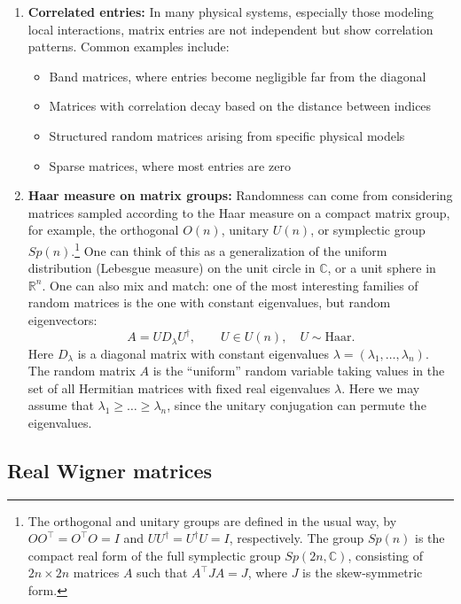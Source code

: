 \documentclass[letterpaper,11pt,oneside,reqno]{book}
\numberwithin{equation}{chapter}  %
\theoremstyle{definition}
\begin{document}
\begin{enumerate}
\item \textbf{Correlated entries:}
In many physical systems, especially those modeling local interactions, matrix entries are not independent but show correlation patterns. Common examples include:
\begin{itemize}
\item Band matrices, where entries become negligible far from the diagonal
\item Matrices with correlation decay based on the distance between indices
\item Structured random matrices arising from specific physical models
\item Sparse matrices, where most entries are zero
\end{itemize}
\item \textbf{Haar measure on matrix groups:}
Randomness can come from considering matrices sampled according to the Haar measure on a compact matrix group,
for example, the orthogonal $O(n)$, unitary $U(n)$, or symplectic group $Sp(n)$.\footnote{The
	orthogonal and unitary groups are defined
	in the usual way, by $OO^\top=O^\top O=I$ and $UU^\dagger
	=U^\dagger U=I$, respectively.
	The
	group $Sp(n)$ is the compact real form of the full symplectic group $Sp(2n, \mathbb{C})$,
	consisting of $2n\times 2n$ matrices $A$ such that $A^\top JA=J$, where
	$J$ is the skew-symmetric form.}
One can think of this as a generalization of
the uniform distribution (Lebesgue measure) on the unit circle in $\mathbb{C}$,
or a unit sphere in $\mathbb{R}^n$.
One can also mix and match: one
of the most interesting families of random matrices is the one
with constant eigenvalues, but random eigenvectors:
\begin{equation*}
	A=UD_\lambda U^\dagger,\qquad U\in U(n), \quad U\sim \mathrm{Haar}.
\end{equation*}
Here $D_\lambda$ is a diagonal matrix with constant eigenvalues $\lambda=(\lambda_1,\ldots,\lambda_n)$.
The random matrix $A$ is the ``uniform'' random variable
taking values in the set of all Hermitian matrices with fixed real eigenvalues $\lambda$.
Here we may assume that $\lambda_1\ge \ldots\ge \lambda_n $,
since the unitary conjugation can permute the eigenvalues.
\end{enumerate}

\subsection{Real Wigner matrices}
\end{document}
